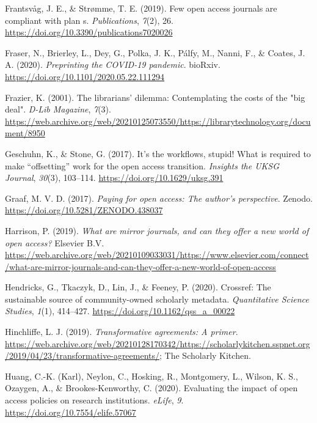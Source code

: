 \documentclass[a4paper,man,floatsintext,longtable,noextraspace,12pt]{apa6}
\newlength{\cslhangindent}
\newenvironment{cslreferences}%
  {\setlength{\parindent}{0pt}%
  \everypar{\setlength{\hangindent}{\cslhangindent}}\ignorespaces}%
  {\par}
\begin{document}
\begin{cslreferences}
\leavevmode\hypertarget{ref-Frantsv_g_2019}{}%
Frantsvåg, J. E., \& Strømme, T. E. (2019). Few open access journals are
compliant with plan s. \emph{Publications}, \emph{7}(2), 26.
\url{https://doi.org/10.3390/publications7020026}

\leavevmode\hypertarget{ref-Fraser_2020}{}%
Fraser, N., Brierley, L., Dey, G., Polka, J. K., Pálfy, M., Nanni, F.,
\& Coates, J. A. (2020). \emph{Preprinting the COVID-19 pandemic}.
bioRxiv. \url{https://doi.org/10.1101/2020.05.22.111294}

\leavevmode\hypertarget{ref-Frazier_2001}{}%
Frazier, K. (2001). The librarians' dilemma: Contemplating the costs of
the "big deal". \emph{D-Lib Magazine}, \emph{7}(3).
\url{https://web.archive.org/web/20210125073550/https://librarytechnology.org/document/8950}

\leavevmode\hypertarget{ref-Geschuhn_2017}{}%
Geschuhn, K., \& Stone, G. (2017). It's the workflows, stupid! What is
required to make ``offsetting'' work for the open access transition.
\emph{Insights the UKSG Journal}, \emph{30}(3), 103--114.
\url{https://doi.org/10.1629/uksg.391}

\leavevmode\hypertarget{ref-Graaf_2017}{}%
Graaf, M. V. D. (2017). \emph{Paying for open access: The author's
perspective}. Zenodo. \url{https://doi.org/10.5281/ZENODO.438037}

\leavevmode\hypertarget{ref-Harrison_2019}{}%
Harrison, P. (2019). \emph{What are mirror journals, and can they offer
a new world of open access?} Elsevier B.V.
\url{https://web.archive.org/web/20210109033031/https://www.elsevier.com/connect/what-are-mirror-journals-and-can-they-offer-a-new-world-of-open-access}

\leavevmode\hypertarget{ref-Hendricks_2020}{}%
Hendricks, G., Tkaczyk, D., Lin, J., \& Feeney, P. (2020). Crossref: The
sustainable source of community-owned scholarly metadata.
\emph{Quantitative Science Studies}, \emph{1}(1), 414--427.
\url{https://doi.org/10.1162/qss_a_00022}

\leavevmode\hypertarget{ref-Hinchliffe_2019}{}%
Hinchliffe, L. J. (2019). \emph{Transformative agreements: A primer}.
\url{https://web.archive.org/web/20210128170342/https://scholarlykitchen.sspnet.org/2019/04/23/transformative-agreements/};
The Scholarly Kitchen.

\leavevmode\hypertarget{ref-Huang_2020}{}%
Huang, C.-K. (Karl), Neylon, C., Hosking, R., Montgomery, L., Wilson, K.
S., Ozaygen, A., \& Brookes-Kenworthy, C. (2020). Evaluating the impact
of open access policies on research institutions. \emph{eLife},
\emph{9}. \url{https://doi.org/10.7554/elife.57067}


\end{cslreferences}
\end{document}
